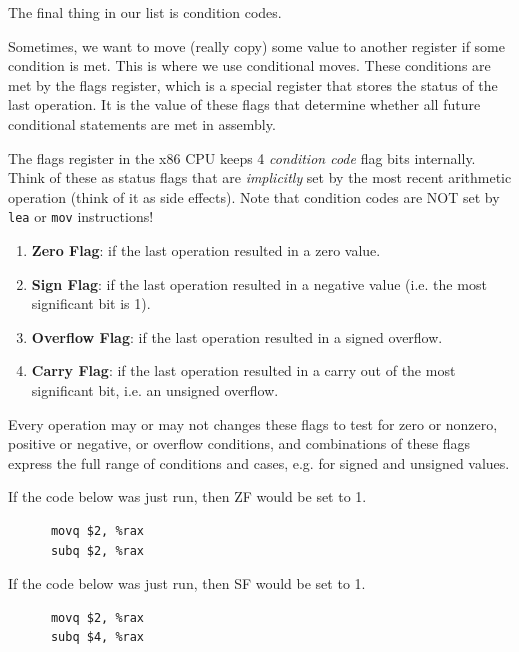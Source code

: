 \documentclass{article}
\begin{document}
  The final thing in our list is condition codes. 

  Sometimes, we want to move (really copy) some value to another register if some condition is met. This is where we use conditional moves. These conditions are met by the flags register, which is a special register that stores the status of the last operation. It is the value of these flags that determine whether all future conditional statements are met in assembly. 
  
  \begin{definition}
    The flags register in the x86 CPU keeps 4 \textit{condition code} flag bits internally. Think of these as status flags that are \textit{implicitly} set by the most recent arithmetic operation (think of it as side effects). Note that condition codes are NOT set by \texttt{lea} or \texttt{mov} instructions! 
    \begin{enumerate}
      \item \textbf{Zero Flag}: if the last operation resulted in a zero value.
      \item \textbf{Sign Flag}: if the last operation resulted in a negative value (i.e. the most significant bit is 1).
      \item \textbf{Overflow Flag}: if the last operation resulted in a signed overflow.
      \item \textbf{Carry Flag}: if the last operation resulted in a carry out of the most significant bit, i.e. an unsigned overflow. 
    \end{enumerate}
    Every operation may or may not changes these flags to test for zero or nonzero, positive or negative, or overflow conditions, and combinations of these flags express the full range of conditions and cases, e.g. for signed and unsigned values. 
  \end{definition}

  \begin{example}
    If the code below was just run, then ZF would be set to 1. 
    \begin{lstlisting}
      movq $2, %rax 
      subq $2, %rax
    \end{lstlisting}
  \end{example}

  \begin{example}
    If the code below was just run, then SF would be set to 1. 
    \begin{lstlisting}
      movq $2, %rax 
      subq $4, %rax
    \end{lstlisting}
  \end{example}
\end{document}
